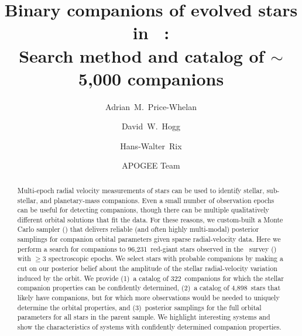 \documentclass[modern, letterpaper]{aastex62}
\newcommand{\apogee}{\project{\acronym{APOGEE}}}
\newcommand{\thejoker}{\project{The~Joker}}
\newcommand{\DR}{\acronym{DR14}}
\newcommand{\nstars}{96,231}
\newcommand{\nhighK}{4,898}
\newcommand{\nunimodal}{322}
\begin{document}
\sloppy\sloppypar\raggedbottom\frenchspacing %

\title{Binary companions of evolved stars in \apogee\ \DR: \\
       Search method and catalog of $\sim$5,000 companions}

\author[0000-0003-0872-7098]{Adrian~M.~Price-Whelan}

\author[0000-0003-2866-9403]{David~W.~Hogg}

\author[0000-0003-4996-9069]{Hans-Walter~Rix}

\author{APOGEE Team}

\begin{abstract}\noindent %
Multi-epoch radial velocity measurements of stars can be used to identify
stellar, sub-stellar, and planetary-mass companions.
Even a small number of observation epochs can be useful for detecting
companions, though there can be multiple qualitatively different orbital
solutions that fit the data.
For these reasons, we custom-built a Monte Carlo sampler (\thejoker) that
delivers reliable (and often highly multi-modal) posterior samplings for
companion orbital parameters given sparse radial-velocity data.
Here we perform a search for companions to \nstars\ red-giant stars observed in
the \apogee\ survey (\DR) with $\geq 3$ spectroscopic epochs.
We select stars with probable companions by making a cut on our posterior belief
about the amplitude of the stellar radial-velocity variation induced by the
orbit.
We provide (1)~a catalog of \nunimodal\ companions for which the stellar
companion properties can be confidently determined, (2)~a catalog of \nhighK\
stars that likely have companions, but for which more observations would be
needed to uniquely determine the orbital properties, and (3)~posterior samplings
for the full orbital parameters for all stars in the parent sample.
We highlight interesting systems and show the characteristics of systems with
confidently determined companion properties.
\end{abstract}
\end{document}
